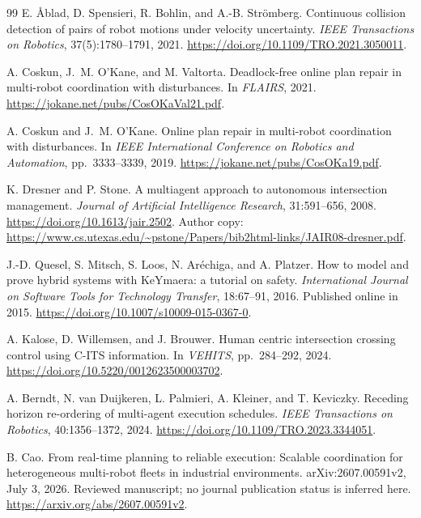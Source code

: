 \documentclass[11pt,a4paper]{article}
\theoremstyle{remark}
\begin{document}
\begin{thebibliography}{99}
E. {\AA}blad, D. Spensieri, R. Bohlin, and A.-B. Str\"omberg.
\newblock Continuous collision detection of pairs of robot motions under velocity uncertainty.
\newblock \emph{IEEE Transactions on Robotics}, 37(5):1780--1791, 2021.
\newblock \url{https://doi.org/10.1109/TRO.2021.3050011}.

A. Coskun, J.~M. O'Kane, and M. Valtorta.
\newblock Deadlock-free online plan repair in multi-robot coordination with disturbances.
\newblock In \emph{FLAIRS}, 2021.
\newblock \url{https://jokane.net/pubs/CosOKaVal21.pdf}.

A. Coskun and J.~M. O'Kane.
\newblock Online plan repair in multi-robot coordination with disturbances.
\newblock In \emph{IEEE International Conference on Robotics and Automation},
pp.~3333--3339, 2019.
\newblock \url{https://jokane.net/pubs/CosOKa19.pdf}.

K. Dresner and P. Stone.
\newblock A multiagent approach to autonomous intersection management.
\newblock \emph{Journal of Artificial Intelligence Research}, 31:591--656, 2008.
\newblock \url{https://doi.org/10.1613/jair.2502}.
\newblock Author copy: \url{https://www.cs.utexas.edu/~pstone/Papers/bib2html-links/JAIR08-dresner.pdf}.

J.-D. Quesel, S. Mitsch, S. Loos, N. Ar\'echiga, and A. Platzer.
\newblock How to model and prove hybrid systems with KeYmaera: a tutorial on safety.
\newblock \emph{International Journal on Software Tools for Technology Transfer},
18:67--91, 2016. Published online in 2015.
\newblock \url{https://doi.org/10.1007/s10009-015-0367-0}.

A. Kalose, D. Willemsen, and J. Brouwer.
\newblock Human centric intersection crossing control using C-ITS information.
\newblock In \emph{VEHITS}, pp.~284--292, 2024.
\newblock \url{https://doi.org/10.5220/0012623500003702}.

A. Berndt, N. van Duijkeren, L. Palmieri, A. Kleiner, and T. Keviczky.
\newblock Receding horizon re-ordering of multi-agent execution schedules.
\newblock \emph{IEEE Transactions on Robotics}, 40:1356--1372, 2024.
\newblock \url{https://doi.org/10.1109/TRO.2023.3344051}.

B. Cao.
\newblock From real-time planning to reliable execution: Scalable coordination
for heterogeneous multi-robot fleets in industrial environments.
\newblock arXiv:2607.00591v2, July 3, 2026. Reviewed manuscript;
no journal publication status is inferred here.
\newblock \url{https://arxiv.org/abs/2607.00591v2}.


\end{thebibliography}
\end{document}
